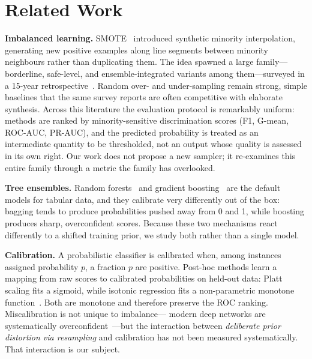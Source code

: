 \documentclass[conference]{IEEEtran}
\begin{document}
\section{Related Work}
\textbf{Imbalanced learning.} SMOTE~\cite{chawla2002smote} introduced
synthetic minority interpolation, generating new positive examples along
line segments between minority neighbours rather than duplicating them.
The idea spawned a large family---borderline, safe-level, and
ensemble-integrated variants among them---surveyed in a 15-year
retrospective~\cite{fernandez2018smote}. Random over- and under-sampling
remain strong, simple baselines that the same survey reports are often
competitive with elaborate synthesis. Across this literature the
evaluation protocol is remarkably uniform: methods are ranked by
minority-sensitive discrimination scores (F1, G-mean, ROC-AUC,
PR-AUC), and the predicted probability is treated as an intermediate
quantity to be thresholded, not an output whose quality is assessed in
its own right. Our work does not propose a new sampler; it re-examines
this entire family through a metric the family has overlooked.

\textbf{Tree ensembles.} Random forests~\cite{breiman2001random} and
gradient boosting~\cite{chen2016xgboost} are the default models for
tabular data, and they calibrate very differently out of the box:
bagging tends to produce probabilities pushed away from 0 and 1, while
boosting produces sharp, overconfident scores. Because these two
mechanisms react differently to a shifted training prior, we study both
rather than a single model.

\textbf{Calibration.} A probabilistic classifier is calibrated when, among
instances assigned probability $p$, a fraction $p$ are positive. Post-hoc
methods learn a mapping from raw scores to calibrated probabilities on
held-out data: Platt scaling fits a sigmoid, while isotonic regression
fits a non-parametric monotone
function~\cite{niculescu2005predicting}. Both are monotone and therefore
preserve the ROC ranking. Miscalibration is not unique to imbalance---
modern deep networks are systematically
overconfident~\cite{guo2017calibration}---but the interaction between
\emph{deliberate prior distortion via resampling} and calibration has
not been measured systematically. That interaction is our subject.
\end{document}
